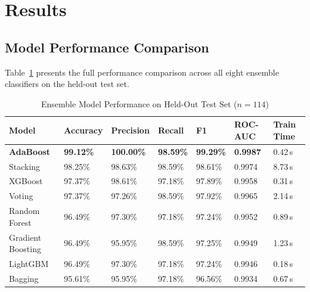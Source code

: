 \documentclass[10pt,letterpaper]{article}
\begin{document}
\section{Results}
\label{sec:results}

\subsection{Model Performance Comparison}

Table~\ref{tab:model_comparison} presents the full performance comparison across all eight
ensemble classifiers on the held-out test set.

\begin{table}[h]
\centering
\caption{Ensemble Model Performance on Held-Out Test Set ($n=114$)}
\label{tab:model_comparison}
\begin{tabular}{lllllll}
\toprule
\textbf{Model} & \textbf{Accuracy} & \textbf{Precision} & \textbf{Recall} & \textbf{F1} & \textbf{ROC-AUC} & \textbf{Train Time} \\
\midrule
\textbf{AdaBoost} & \textbf{99.12\%} & \textbf{100.00\%} & \textbf{98.59\%} & \textbf{99.29\%} & \textbf{0.9987} & 0.42\,s \\
Stacking          & 98.25\%          & 98.63\%           & 98.59\%          & 98.61\%          & 0.9974           & 8.73\,s \\
XGBoost           & 97.37\%          & 98.61\%           & 97.18\%          & 97.89\%          & 0.9958           & 0.31\,s \\
Voting            & 97.37\%          & 97.26\%           & 98.59\%          & 97.92\%          & 0.9965           & 2.14\,s \\
Random Forest     & 96.49\%          & 97.30\%           & 97.18\%          & 97.24\%          & 0.9952           & 0.89\,s \\
Gradient Boosting & 96.49\%          & 95.95\%           & 98.59\%          & 97.25\%          & 0.9949           & 1.23\,s \\
LightGBM          & 96.49\%          & 97.30\%           & 97.18\%          & 97.24\%          & 0.9946           & 0.18\,s \\
Bagging           & 95.61\%          & 95.95\%           & 97.18\%          & 96.56\%          & 0.9934           & 0.67\,s \\
\bottomrule
\end{tabular}
\end{table}
\end{document}
